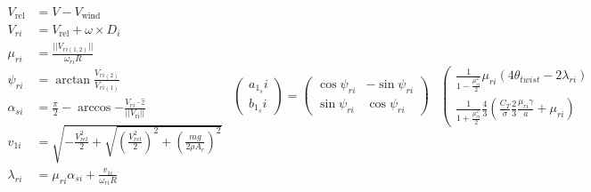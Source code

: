     \begin{subequations}
        \label{eq:observer:flapping}
        \begin{align}
            V_{\text{rel}} &= V - V_{\text{wind}} \\
%
            V_{ri} &= V_{\text{rel}} + \omega \times D_{i} \\ %
%
            \mu_{ri} &= \frac{||V_{ri(1,2)}||}{\omega_{ri}R} \\
%
            \psi_{ri} &= \arctan{\frac{V_{ri(2)}}{V_{ri(1)}}} \\%
%
            \alpha_{si} &= \frac{\pi}{2} - \arccos{ -\frac{V_{ri} \cdot \hat{z}}{||V_{\text{ri}}||} } \\
%
            v_{1i} &= \sqrt{
                -\frac{V_{rel}^{2}}{2} + \sqrt{
                    \left( \frac{V_{rel}^{2}}{2} \right)^{2}
                    + \left( \frac{mg}{2 \rho A_{r}} \right)^{2}
                }
            } \label{eq:observer:inducedvelocity}\\
%
            \lambda_{ri} &= \mu_{ri}\alpha_{si} + \frac{v_{1i}}{\omega_{ri} R} \label{eq:observer:lambdari}
        \end{align}
        \begin{equation}
            \label{eq:observer:flapping:ab}
            \begin{array}{rr}\left(
                \begin{array}{c}
                    a_{1_{s}}i \\
                    b_{1_{s}}i
                \end{array} \right)
                = \left(
                \begin{array}{cc}
                    \cos{\psi_{ri}} & -\sin{\psi_{ri}} \\
                    \sin{\psi_{ri}} & \cos{\psi_{ri}}
                \end{array}
                \right) & \left(
                    \begin{array}{c}
                        \frac{1}{1 - \frac{\mu_{ri}^{2}}{2}}\mu_{ri}\left( 4 \theta_{twist} - 2\lambda_{ri}\right) \\
                        \frac{1}{1 + \frac{\mu_{ri}^{2}}{2}}\frac{4}{3}\left( \frac{C_{T}}{\sigma}\frac{2}{3}\frac{\mu_{ri}\gamma}{a} + \mu_{ri}\right)
                    \end{array}

\end{array}
\end{equation}
\end{subequations}
